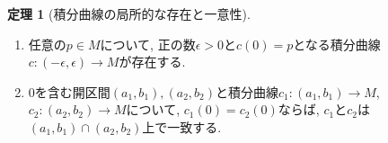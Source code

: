 \documentclass[dvipdfmx,a4paper,11pt]{article}
\theoremstyle{definition}
\newtheorem{thm}{定理}
\begin{document}
    \begin{tcolorbox}[
    colback = white,
    colframe = green!35!black,
    fonttitle = \bfseries,
    breakable = true]
    \begin{thm}[積分曲線の局所的な存在と一意性]
    \text{}
    \begin{enumerate}
        \setlength{\parskip}{0cm}
  \setlength{\itemsep}{2pt} 
    \item 任意の$p \in M$について, 正の数$\epsilon >0$と$c(0)=p$となる積分曲線$c : (-\epsilon, \epsilon) \rightarrow M$が存在する.
    \item $0$を含む開区間$(a_1, b_1), (a_2, b_2) $と積分曲線$c_1 : (a_1, b_1) \rightarrow M$, $c_2 : (a_2, b_2) \rightarrow M$について, $c_1(0) =c_2(0)$ならば, $c_1$と$c_2$は$(a_1, b_1) \cap (a_2, b_2) $上で一致する. 
    \end{enumerate}

    \end{thm}
    \end{tcolorbox}
  
\end{document}
